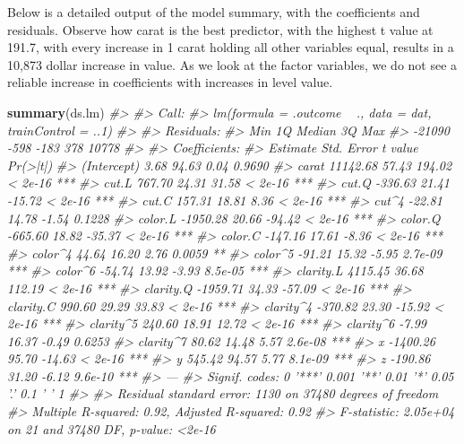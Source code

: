 \documentclass[]{book}
\newenvironment{Shaded}{\begin{snugshade}}{\end{snugshade}}
\newcommand{\CommentTok}[1]{\textcolor[rgb]{0.56,0.35,0.01}{\textit{#1}}}
\newcommand{\KeywordTok}[1]{\textcolor[rgb]{0.13,0.29,0.53}{\textbf{#1}}}
\newcommand{\NormalTok}[1]{#1}
\begin{document}
Below is a detailed output of the model summary, with the coefficients and residuals. Observe how carat is the best predictor, with the highest t value at 191.7, with every increase in 1 carat holding all other variables equal, results in a 10,873 dollar increase in value. As we look at the factor variables, we do not see a reliable increase in coefficients with increases in level value.

\begin{Shaded}
\begin{Highlighting}[]
\KeywordTok{summary}\NormalTok{(ds.lm)}
\CommentTok{#> }
\CommentTok{#> Call:}
\CommentTok{#> lm(formula = .outcome ~ ., data = dat, trainControl = ..1)}
\CommentTok{#> }
\CommentTok{#> Residuals:}
\CommentTok{#>    Min     1Q Median     3Q    Max }
\CommentTok{#> -21090   -598   -183    378  10778 }
\CommentTok{#> }
\CommentTok{#> Coefficients:}
\CommentTok{#>             Estimate Std. Error t value Pr(>|t|)    }
\CommentTok{#> (Intercept)     3.68      94.63    0.04   0.9690    }
\CommentTok{#> carat       11142.68      57.43  194.02  < 2e-16 ***}
\CommentTok{#> cut.L         767.70      24.31   31.58  < 2e-16 ***}
\CommentTok{#> cut.Q        -336.63      21.41  -15.72  < 2e-16 ***}
\CommentTok{#> cut.C         157.31      18.81    8.36  < 2e-16 ***}
\CommentTok{#> cut^4         -22.81      14.78   -1.54   0.1228    }
\CommentTok{#> color.L     -1950.28      20.66  -94.42  < 2e-16 ***}
\CommentTok{#> color.Q      -665.60      18.82  -35.37  < 2e-16 ***}
\CommentTok{#> color.C      -147.16      17.61   -8.36  < 2e-16 ***}
\CommentTok{#> color^4        44.64      16.20    2.76   0.0059 ** }
\CommentTok{#> color^5       -91.21      15.32   -5.95  2.7e-09 ***}
\CommentTok{#> color^6       -54.74      13.92   -3.93  8.5e-05 ***}
\CommentTok{#> clarity.L    4115.45      36.68  112.19  < 2e-16 ***}
\CommentTok{#> clarity.Q   -1959.71      34.33  -57.09  < 2e-16 ***}
\CommentTok{#> clarity.C     990.60      29.29   33.83  < 2e-16 ***}
\CommentTok{#> clarity^4    -370.82      23.30  -15.92  < 2e-16 ***}
\CommentTok{#> clarity^5     240.60      18.91   12.72  < 2e-16 ***}
\CommentTok{#> clarity^6      -7.99      16.37   -0.49   0.6253    }
\CommentTok{#> clarity^7      80.62      14.48    5.57  2.6e-08 ***}
\CommentTok{#> x           -1400.26      95.70  -14.63  < 2e-16 ***}
\CommentTok{#> y             545.42      94.57    5.77  8.1e-09 ***}
\CommentTok{#> z            -190.86      31.20   -6.12  9.6e-10 ***}
\CommentTok{#> ---}
\CommentTok{#> Signif. codes:  0 '***' 0.001 '**' 0.01 '*' 0.05 '.' 0.1 ' ' 1}
\CommentTok{#> }
\CommentTok{#> Residual standard error: 1130 on 37480 degrees of freedom}
\CommentTok{#> Multiple R-squared:  0.92,   Adjusted R-squared:  0.92 }
\CommentTok{#> F-statistic: 2.05e+04 on 21 and 37480 DF,  p-value: <2e-16}
\end{Highlighting}
\end{Shaded}
\end{document}
